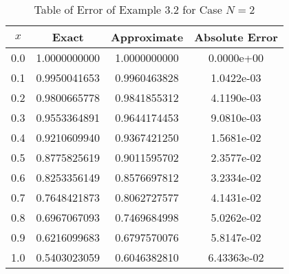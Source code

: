 \documentclass[12pt]{report}
\begin{document}
	\begin{table}[!hbt]
		\caption{Table of Error of Example 3.2 for Case $N=2$}
		\begin{center}
			\begin{tabular}{|c||c||c||c||}
				\hline
				$x$ & Exact & Approximate & Absolute Error\\ \hline
				0.0 & 1.0000000000 & 1.0000000000 & 0.0000e+00\\ \hline
				0.1 & 0.9950041653 & 0.9960463828 & 1.0422e-03\\ \hline
				0.2 & 0.9800665778 & 0.9841855312 & 4.1190e-03\\ \hline
				0.3 & 0.9553364891 & 0.9644174453 & 9.0810e-03\\ \hline
				0.4 & 0.9210609940 & 0.9367421250 & 1.5681e-02\\ \hline
				0.5 & 0.8775825619 & 0.9011595702 & 2.3577e-02\\ \hline
				0.6 & 0.8253356149 & 0.8576697812 & 3.2334e-02\\ \hline
				0.7 & 0.7648421873 & 0.8062727577 & 4.1431e-02\\ \hline
				0.8 & 0.6967067093 & 0.7469684998 & 5.0262e-02\\ \hline
				0.9 & 0.6216099683 & 0.6797570076 & 5.8147e-02\\ \hline
				1.0 & 0.5403023059 & 0.6046382810 & 6.43363e-02\\ \hline
			\end{tabular}
		\end{center}
		\label{tb:4_3}
	\end{table}
\end{document}
